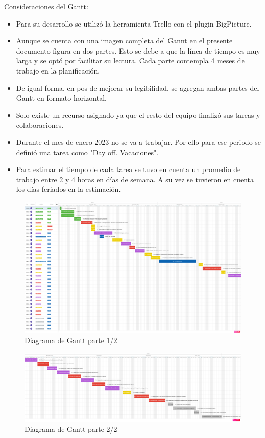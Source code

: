 \documentclass[
11pt, %
codirector, %
]{charter}
\begin{document}
Consideraciones del Gantt:
\begin{itemize}
\item Para su desarrollo se utilizó la herramienta Trello con el plugin BigPicture.
\item Aunque se cuenta con una imagen completa del Gannt en el presente documento figura en dos partes. Esto se debe a que la línea de tiempo es muy larga y se optó por facilitar su lectura. Cada parte contempla 4 meses de trabajo en la planificación.
\item De igual forma, en pos de mejorar su legibilidad, se agregan ambas partes del Gantt en formato horizontal.
\item Solo existe un recurso asignado ya que el resto del equipo finalizó sus tareas y colaboraciones.
\item Durante el mes de enero 2023 no se va a trabajar. Por ello para ese periodo se definió una tarea como "Day off. Vacaciones".
\item Para estimar el tiempo de cada tarea se tuvo en cuenta un promedio de trabajo entre 2 y 4 horas en días de semana. A su vez se tuvieron en cuenta los días feriados en la estimación.
\end{itemize}

\begin{landscape}
\begin{figure}[htpb]
\centering 
\includegraphics[height=.95\textheight]{./Figuras/Gantt-parte1-2.png}
\caption{Diagrama de Gantt parte 1/2}
\label{fig:diagGantt1-2}
\end{figure}
\end{landscape}

\begin{landscape}
\begin{figure}[htpb]
\centering 
\includegraphics[height=.5\textheight]{./Figuras/Gantt-parte2-2.png}
\caption{Diagrama de Gantt parte 2/2}
\label{fig:diagGantt2-2}
\end{figure}
\end{landscape}
\end{document}
